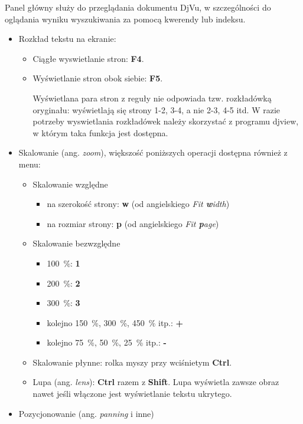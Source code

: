 \documentclass{mwart}
\def\key#1{\textbf{#1}}
\begin{document}
Panel główny służy do przeglądania dokumentu DjVu, w szczególności do
oglądania wyniku wyszukiwania za pomocą kwerendy lub indeksu.

\begin{itemize}
  
\item Rozkład tekstu na ekranie:
  \begin{itemize}
  \item Ciągłe wyswietlanie stron: \key{F4}.
  \item Wyświetlanie stron obok siebie: \key{F5}.

    Wyświetlana para stron z reguły nie odpowiada tzw. rozkładówką
    oryginału: wyświetlają się strony 1-2, 3-4, a nie 2-3, 4-5 itd. W
    razie potrzeby wyswietlania rozkładówek należy skorzystać z
    programu \textsf{djview}, w którym taka funkcja jest dostępna.
  \end{itemize}
\item Skalowanie (ang. \textit{zoom}), większość poniższych operacji
  dostępna również z menu:
  \begin{itemize}
  \item Skalowanie względne
    \begin{itemize}
    \item na szerokość strony: \key{w} (od angielskiego \textit{Fit
\textbf{w}idth})
    \item na rozmiar strony: \key{p} (od angielskiego \textit{Fit
\textbf{p}age})
    \end{itemize}
  \item Skalowanie bezwzględne
    \begin{itemize}
    \item 100~\%: \key{1}
    \item 200~\%: \key{2}
    \item 300~\%: \key{3}
    \item kolejno 150~\%, 300~\%, 450~\% itp.: \key{+}
    \item kolejno 75~\%, 50~\%, 25~\% itp.: \key{-}
    \end{itemize}
  \item Skalowanie płynne: rolka myszy przy wciśnietym \key{Ctrl}.
  \item Lupa (ang. \textit{lens}): \key{Ctrl} razem z
    \key{Shift}. Lupa wyświetla zawsze obraz nawet jeśli włączone jest
    wyświetlanie tekstu ukrytego.
\end{itemize}
  \item Pozycjonowanie (ang. \textit{panning} i inne)

\end{itemize}
\end{document}
